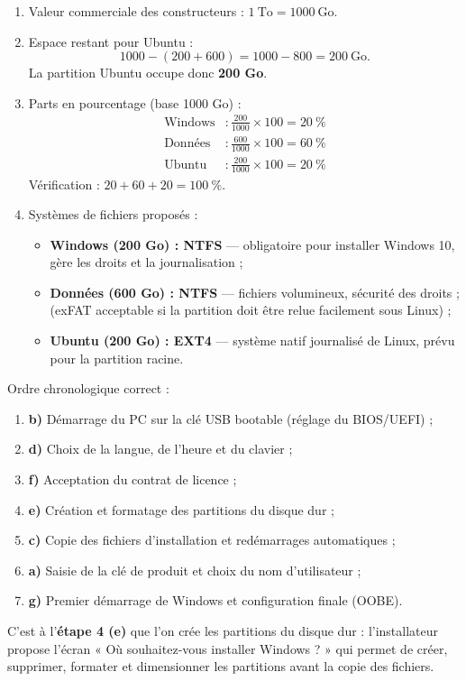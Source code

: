 \documentclass[11pt]{article}
\begin{document}
\begin{corrige}
\begin{enumerate}
  \item Valeur commerciale des constructeurs : $1\ \text{To} = 1000\ \text{Go}$.
  \item Espace restant pour Ubuntu :
  \[ 1000 - (200 + 600) = 1000 - 800 = 200\ \text{Go}. \]
  La partition Ubuntu occupe donc \textbf{200 Go}.
  \item Parts en pourcentage (base 1000 Go) :
  \begin{align*}
  \text{Windows} &: \frac{200}{1000}\times 100 = 20\ \% \\
  \text{Données} &: \frac{600}{1000}\times 100 = 60\ \% \\
  \text{Ubuntu} &: \frac{200}{1000}\times 100 = 20\ \%
  \end{align*}
  Vérification : $20 + 60 + 20 = 100\ \%$.
  \item Systèmes de fichiers proposés :
  \begin{itemize}
    \item \textbf{Windows (200 Go) : NTFS} — obligatoire pour installer Windows 10, gère les droits et la journalisation ;
    \item \textbf{Données (600 Go) : NTFS} — fichiers volumineux, sécurité des droits ; (exFAT acceptable si la partition doit être relue facilement sous Linux) ;
    \item \textbf{Ubuntu (200 Go) : EXT4} — système natif journalisé de Linux, prévu pour la partition racine.
  \end{itemize}
\end{enumerate}
\end{corrige}

\begin{corrige}
Ordre chronologique correct :
\begin{enumerate}
  \item \textbf{b)} Démarrage du PC sur la clé USB bootable (réglage du BIOS/UEFI) ;
  \item \textbf{d)} Choix de la langue, de l'heure et du clavier ;
  \item \textbf{f)} Acceptation du contrat de licence ;
  \item \textbf{e)} Création et formatage des partitions du disque dur ;
  \item \textbf{c)} Copie des fichiers d'installation et redémarrages automatiques ;
  \item \textbf{a)} Saisie de la clé de produit et choix du nom d'utilisateur ;
  \item \textbf{g)} Premier démarrage de Windows et configuration finale (OOBE).
\end{enumerate}
C'est à l'\textbf{étape 4 (e)} que l'on crée les partitions du disque dur : l'installateur propose l'écran « Où souhaitez-vous installer Windows ? » qui permet de créer, supprimer, formater et dimensionner les partitions avant la copie des fichiers.
\end{corrige}
\end{document}
